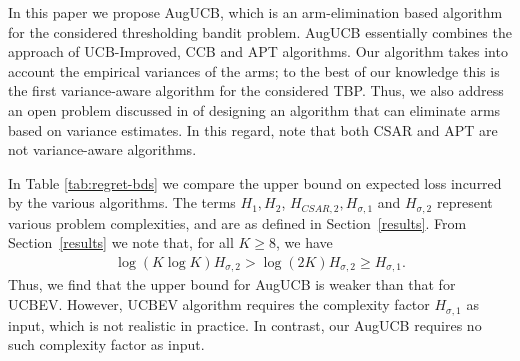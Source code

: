 In this paper we propose AugUCB, which is an arm-elimination based algorithm for the considered thresholding bandit problem. AugUCB essentially combines the approach of UCB-Improved, CCB \cite{liu2016modification} and APT algorithms. Our algorithm takes into account the empirical variances of the arms; to the best of our knowledge this is the first variance-aware algorithm for the considered TBP. 
Thus, we also address an open problem discussed in \cite{auer2010ucb} of designing an algorithm that can eliminate arms based on variance estimates. In this regard, note that both CSAR and APT are not variance-aware algorithms. 

In Table \ref{tab:regret-bds} we compare the upper bound on expected loss incurred by the various algorithms. The terms $H_1, H_2$, $H_{CSAR,2}, H_{\sigma,1}$ and $H_{\sigma,2}$ represent various problem complexities, and are as defined in Section~\ref{results}. From Section~\ref{results} we note that, for all $K\ge8$, we have
\begin{align*}
\log\left(K\log K\right) H_{\sigma,2} > \log(2K) H_{\sigma,2} \ge H_{\sigma,1}.
\end{align*}
Thus, we find that the upper bound for AugUCB is weaker than that for UCBEV.
 However, UCBEV algorithm requires  the complexity factor $H_{\sigma,1}$ as input, which is not realistic in practice. In contrast, our AugUCB requires no such complexity factor as input. 

